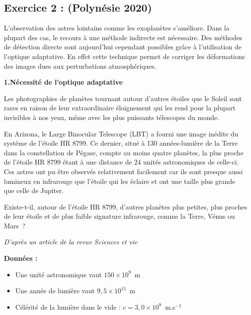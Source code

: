 \documentclass[12pt,a4paper]{article}
\begin{document}
\subsection*{Exercice 2 : (Polynésie 2020)}

L'observation des astres lointains comme les exoplanètes s'améliore. Dans la plupart des cas, le recours à une méthode indirecte est nécessaire. Des méthodes de détection directe sont aujourd'hui cependant possibles grâce à l'utilisation de l'optique adaptative. En effet cette technique permet de corriger les déformations des images dues aux perturbations atmosphériques.

\bigskip

\textbf{1.Nécessité de l'optique adaptative }

\bigskip

\begin{minipage}{0.92\textwidth}
Les photographies de planètes tournant autour d'autres étoiles que le Soleil sont rares en raison de leur extraordinaire éloignement qui les rend pour la plupart invisibles à nos yeux, même avec les plus puissants télescopes du monde.

En Arizona, le Large Binocular Telescope (LBT) a fourni une image inédite du système de l'étoile HR 8799. Ce dernier, situé à 130 années-lumière de la Terre dans la constellation de Pégase, compte au moins quatre planètes, la plus proche de l'étoile HR 8799 étant à une distance de 24 unités astronomiques de celle-ci. Ces astres ont pu être observés relativement facilement car ils sont presque aussi lumineux en infrarouge que l'étoile qui les éclaire et ont une taille plus grande que celle de Jupiter.

Existe-t-il, autour de l'étoile HR 8799, d'autres planètes plus petites, plus proches de leur étoile et de plus faible signature infrarouge, comme la Terre, Vénus ou Mars~?

\begin{flushright}
\small\textit{D'après un article de la revue Sciences et vie}
\end{flushright}
\end{minipage}

\textbf{Données :}
\begin{itemize}[nosep]
  \item Une unité astronomique vaut $150 \times 10^{9}$~m
  \item Une année de lumière vaut $9{,}5 \times 10^{15}$~m
  \item Célérité de la lumière dans le vide : $c = 3{,}0 \times 10^{8}$~m.s$^{-1}$
\end{itemize}
\end{document}
